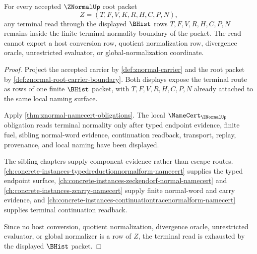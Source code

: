 \begin{theorem}
\label{thm:znormal-terminal-boundary-nonescape}
For every accepted $\ZNormalUp$ root packet
$$
Z=(T,F,V,K,R,H,C,P,N),
$$
any terminal read through the displayed $\BHist$ rows $T,F,V,R,H,C,P,N$ remains inside the finite terminal-normality boundary of the packet. The read cannot export a host conversion row, quotient normalization row, divergence oracle, unrestricted evaluator, or global-normalization coordinate.
\end{theorem}
\begin{proof}
Project the accepted carrier by \autoref{def:znormal-carrier} and the root packet by \autoref{def:znormal-root-carrier-boundary}. Both displays expose the terminal route as rows of one finite $\BHist$ packet, with $T,F,V,R,H,C,P,N$ already attached to the same local naming surface.

Apply \autoref{thm:znormal-namecert-obligations}. The local $\NameCert_{\ZNormalUp}$ obligation reads terminal normality only after typed endpoint evidence, finite fuel, sibling normal-word evidence, continuation readback, transport, replay, provenance, and local naming have been displayed.

The sibling chapters supply component evidence rather than escape routes. \autoref{ch:concrete-instances-typedreductionnormalform-namecert} supplies the typed endpoint surface, \autoref{ch:concrete-instances-zeckendorf-normal-namecert} and \autoref{ch:concrete-instances-zcarry-namecert} supply finite normal-word and carry evidence, and \autoref{ch:concrete-instances-continuationtracenormalform-namecert} supplies terminal continuation readback.

Since no host conversion, quotient normalization, divergence oracle, unrestricted evaluator, or global normalizer is a row of $Z$, the terminal read is exhausted by the displayed $\BHist$ packet.
\end{proof}

